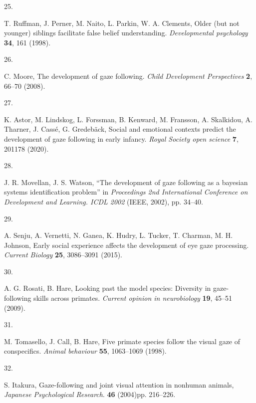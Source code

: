 \documentclass[
  man,floatsintext]{apa6}
\newlength{\cslhangindent}
\newlength{\csllabelwidth}
\newlength{\cslentryspacingunit} %
\newenvironment{CSLReferences}[2] %
 {%
  \setlength{\parindent}{0pt}
  \ifodd #1
  \let\oldpar\par
  \def\par{\hangindent=\cslhangindent\oldpar}
  \fi
  \setlength{\parskip}{#2\cslentryspacingunit}
 }%
 {}
\newcommand{\CSLLeftMargin}[1]{\parbox[t]{\csllabelwidth}{#1}}
\newcommand{\CSLRightInline}[1]{\parbox[t]{\linewidth - \csllabelwidth}{#1}\break}
\begin{document}
\begin{CSLReferences}{0}{0}
\leavevmode{}%
\CSLLeftMargin{25. }%
\CSLRightInline{T. Ruffman, J. Perner, M. Naito, L. Parkin, W. A. Clements, Older (but not younger) siblings facilitate false belief understanding. \emph{Developmental psychology} \textbf{34}, 161 (1998).}

\leavevmode{}%
\CSLLeftMargin{26. }%
\CSLRightInline{C. Moore, The development of gaze following. \emph{Child Development Perspectives} \textbf{2}, 66--70 (2008).}

\leavevmode{}%
\CSLLeftMargin{27. }%
\CSLRightInline{K. Astor, M. Lindskog, L. Forssman, B. Kenward, M. Fransson, A. Skalkidou, A. Tharner, J. Cassé, G. Gredebäck, Social and emotional contexts predict the development of gaze following in early infancy. \emph{Royal Society open science} \textbf{7}, 201178 (2020).}

\leavevmode{}%
\CSLLeftMargin{28. }%
\CSLRightInline{J. R. Movellan, J. S. Watson, {``The development of gaze following as a bayesian systems identification problem''} in \emph{Proceedings 2nd International Conference on Development and Learning. ICDL 2002} (IEEE, 2002), pp. 34--40.}

\leavevmode{}%
\CSLLeftMargin{29. }%
\CSLRightInline{A. Senju, A. Vernetti, N. Ganea, K. Hudry, L. Tucker, T. Charman, M. H. Johnson, Early social experience affects the development of eye gaze processing. \emph{Current Biology} \textbf{25}, 3086--3091 (2015).}

\leavevmode{}%
\CSLLeftMargin{30. }%
\CSLRightInline{A. G. Rosati, B. Hare, Looking past the model species: Diversity in gaze-following skills across primates. \emph{Current opinion in neurobiology} \textbf{19}, 45--51 (2009).}

\leavevmode{}%
\CSLLeftMargin{31. }%
\CSLRightInline{M. Tomasello, J. Call, B. Hare, Five primate species follow the visual gaze of conspecifics. \emph{Animal behaviour} \textbf{55}, 1063--1069 (1998).}

\leavevmode{}%
\CSLLeftMargin{32. }%
\CSLRightInline{S. Itakura, Gaze-following and joint visual attention in nonhuman animals, \emph{Japanese Psychological Research}. \textbf{46} (2004)pp. 216--226.}


\end{CSLReferences}
\end{document}
